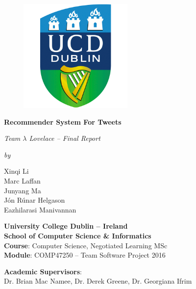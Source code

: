 \documentclass{article}
\begin{document}
\thispagestyle{empty}

\begin{figure}[H]
    \includegraphics[width=0.5\textwidth, center]{ucd_logo_png}
\end{figure}

\vspace{3em}

\begin{center}
	{\LARGE \textbf{Recommender System For Tweets}} \\
	
	\vspace{0.5em}
	
	\textsl{Team $\lambda$ Lovelace -- Final Report} \\
	
	\vspace{1.5em}
	
	\textit{by} \\
	
	\vspace{1.5em}
	
	Xinqi Li \\
	Marc Laffan \\
	Junyang Ma \\
	Jón Rúnar Helgason \\
	Eazhilarasi Manivannan \\
\end{center}

\vspace{5em}

\begin{center}
    \textbf{University College Dublin -- Ireland} \\
    \textbf{School of Computer Science \& Informatics} \\
    \textbf{Course}: Computer Science, Negotiated Learning MSc \\
    \textbf{Module}: COMP47250 -- Team Software Project 2016 \\ 
    
    \vspace{1.5em}
    
    \textbf{Academic Supervisors}: \\
    Dr. Brian Mac Namee, Dr. Derek Greene, Dr. Georgiana Ifrim
\end{center}
\end{document}
